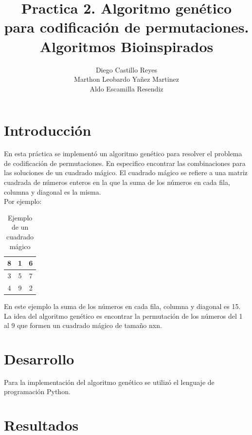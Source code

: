 \documentclass{report}
\title{\Huge{\textbf{Practica 2. Algoritmo genético para codificación de permutaciones.}}\\
\Large{\textbf{Algoritmos Bioinspirados}}}
\author{Diego Castillo Reyes\\Marthon Leobardo Yañez Martinez\\Aldo Escamilla Resendiz}
\begin{document}
    \maketitle
    \tableofcontents
    \newpage

    \section{Introducción}
    En esta práctica se implementó un algoritmo genético para resolver el problema de codificación de 
    permutaciones. En especifico encontrar las combinaciones para las soluciones de un cuadrado mágico.
    El cuadrado mágico se refiere a una matriz cuadrada de números enteros en la que la suma de los números 
    en cada fila, columna y diagonal es la misma.\\

    Por ejemplo: 
    \begin{table}[H]
        \centering
        \begin{tabular}{|c|c|c|}
            \hline
            8 & 1 & 6\\
            \hline
            3 & 5 & 7\\
            \hline
            4 & 9 & 2\\
            \hline
        \end{tabular}
        \caption{Ejemplo de un cuadrado mágico}
    \end{table}
    En este ejemplo la suma de los números en cada fila, columna y diagonal es 15.\\
    La idea del algoritmo genético es encontrar la permutación de los números del 
    1 al 9 que formen un cuadrado mágico de tamaño nxn.\\

    \section{Desarrollo}
    Para la implementación del algoritmo genético se utilizó el lenguaje de programación Python.
    

    \section{Resultados}
\end{document}
